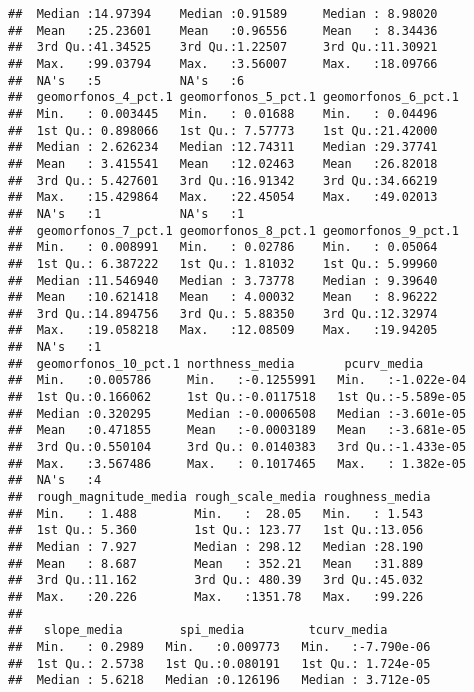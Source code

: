 \documentclass[11pt,]{article}
\begin{document}
\begin{verbatim}
##  Median :14.97394    Median :0.91589     Median : 8.98020   
##  Mean   :25.23601    Mean   :0.96556     Mean   : 8.34436   
##  3rd Qu.:41.34525    3rd Qu.:1.22507     3rd Qu.:11.30921   
##  Max.   :99.03794    Max.   :3.56007     Max.   :18.09766   
##  NA's   :5           NA's   :6                              
##  geomorfonos_4_pct.1 geomorfonos_5_pct.1 geomorfonos_6_pct.1
##  Min.   : 0.003445   Min.   : 0.01688    Min.   : 0.04496   
##  1st Qu.: 0.898066   1st Qu.: 7.57773    1st Qu.:21.42000   
##  Median : 2.626234   Median :12.74311    Median :29.37741   
##  Mean   : 3.415541   Mean   :12.02463    Mean   :26.82018   
##  3rd Qu.: 5.427601   3rd Qu.:16.91342    3rd Qu.:34.66219   
##  Max.   :15.429864   Max.   :22.45054    Max.   :49.02013   
##  NA's   :1           NA's   :1                              
##  geomorfonos_7_pct.1 geomorfonos_8_pct.1 geomorfonos_9_pct.1
##  Min.   : 0.008991   Min.   : 0.02786    Min.   : 0.05064   
##  1st Qu.: 6.387222   1st Qu.: 1.81032    1st Qu.: 5.99960   
##  Median :11.546940   Median : 3.73778    Median : 9.39640   
##  Mean   :10.621418   Mean   : 4.00032    Mean   : 8.96222   
##  3rd Qu.:14.894756   3rd Qu.: 5.88350    3rd Qu.:12.32974   
##  Max.   :19.058218   Max.   :12.08509    Max.   :19.94205   
##  NA's   :1                                                  
##  geomorfonos_10_pct.1 northness_media       pcurv_media        
##  Min.   :0.005786     Min.   :-0.1255991   Min.   :-1.022e-04  
##  1st Qu.:0.166062     1st Qu.:-0.0117518   1st Qu.:-5.589e-05  
##  Median :0.320295     Median :-0.0006508   Median :-3.601e-05  
##  Mean   :0.471855     Mean   :-0.0003189   Mean   :-3.681e-05  
##  3rd Qu.:0.550104     3rd Qu.: 0.0140383   3rd Qu.:-1.433e-05  
##  Max.   :3.567486     Max.   : 0.1017465   Max.   : 1.382e-05  
##  NA's   :4                                                     
##  rough_magnitude_media rough_scale_media roughness_media 
##  Min.   : 1.488        Min.   :  28.05   Min.   : 1.543  
##  1st Qu.: 5.360        1st Qu.: 123.77   1st Qu.:13.056  
##  Median : 7.927        Median : 298.12   Median :28.190  
##  Mean   : 8.687        Mean   : 352.21   Mean   :31.889  
##  3rd Qu.:11.162        3rd Qu.: 480.39   3rd Qu.:45.032  
##  Max.   :20.226        Max.   :1351.78   Max.   :99.226  
##                                                          
##   slope_media        spi_media         tcurv_media        
##  Min.   : 0.2989   Min.   :0.009773   Min.   :-7.790e-06  
##  1st Qu.: 2.5738   1st Qu.:0.080191   1st Qu.: 1.724e-05  
##  Median : 5.6218   Median :0.126196   Median : 3.712e-05  

\end{verbatim}
\end{document}
